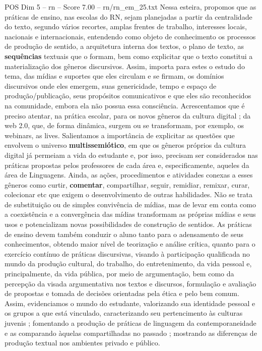 \begin{textsample}{POS Dim 5 – rn – Score 7.00 – rn/rn\_em\_25.txt}
Nessa esteira, propomos que as práticas de ensino, nas escolas do RN, sejam planejadas a partir da centralidade do texto, segundo vários recortes, amplas frentes de trabalho, interesses locais, nacionais e internacionais, entendendo como objeto de conhecimento os processos de produção de sentido, a arquitetura interna dos textos, o plano de texto, as \textbf{sequências} textuais que o formam, bem como explicitar que o texto constitui a materialização dos gêneros discursivos.
Assim, importa para estes o estudo do tema, das mídias e suportes que eles circulam e se firmam, os domínios discursivos onde eles emergem, suas genericidade, tempo e espaço de produção/publicação, seus propósitos comunicativos e que eles são reconhecidos na comunidade, embora ela não possua essa consciência.
Acrescentamos que é preciso atentar, na prática escolar, para os novos gêneros da cultura digital ; da web 2.0, que, de forma dinâmica, surgem ou se transformam, por exemplo, os webinars, as lives.
Salientamos a importância de explicitar as questões que envolvem o universo \textbf{multissemiótico}, em que os gêneros próprios da cultura digital já permeiam a vida do estudante e, por isso, precisam ser considerados nas práticas propostas pelos professores de cada área e, especificamente, aqueles da área de Linguagens.
Ainda, as ações, procedimentos e atividades conexas a esses gêneros como curtir, \textbf{comentar}, compartilhar, seguir, remidiar, remixar, curar, colecionar etc que exigem o desenvolvimento de outras habilidades.
Não se trata de substituição ou de simples convivência de mídias, mas de levar em conta como a coexistência e a convergência das mídias transformam as próprias mídias e seus usos e potencializam novas possibilidades de construção de sentidos.
As práticas de ensino devem também conduzir o aluno tanto para o adensamento de seus conhecimentos, obtendo maior nível de teorização e análise crítica, quanto para o exercício contínuo de práticas discursivas, visando à participação qualificada no mundo da produção cultural, do trabalho, do entretenimento, da vida pessoal e, principalmente, da vida pública, por meio de argumentação, bem como da percepção da visada argumentativa nos textos e discursos, formulação e avaliação de propostas e tomada de decisões orientadas pela ética e pelo bem comum.
Assim, evidenciamos o mundo do estudante, valorizando sua identidade pessoal e os grupos a que está vinculado, caracterizando seu pertencimento às culturas juvenis ; fomentando a produção de práticas de linguagem da contemporaneidade e as comparando àquelas compartilhadas no passado ; mostrando as diferenças de produção textual nos ambientes privado e público.

\end{textsample}
